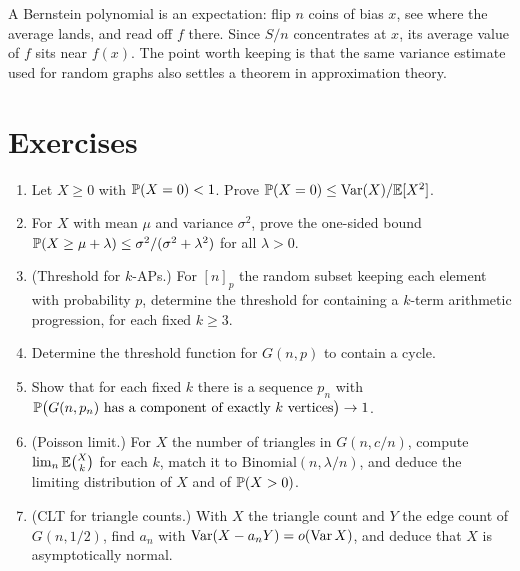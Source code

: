 \begin{insight}
A Bernstein polynomial is an expectation: flip $n$ coins of bias $x$, see where
the average lands, and read off $f$ there. Since $S/n$ concentrates at $x$, its
average value of $f$ sits near $f(x)$. The point worth keeping is that the same
variance estimate used for random graphs also settles a theorem in
approximation theory.
\end{insight}

\section*{Exercises}

\begin{enumerate}[itemsep=4pt]
  \item Let $X\ge0$ with $\mathbb{P}(X=0)<1$. Prove
        $\mathbb{P}(X=0)\le\operatorname{Var}(X)/\mathbb{E}[X^2]$.
  \item For $X$ with mean $\mu$ and variance $\sigma^2$, prove the one-sided
        bound $\mathbb{P}(X\ge\mu+\lambda)\le\sigma^2/(\sigma^2+\lambda^2)$ for all
        $\lambda>0$.
  \item (Threshold for $k$-APs.) For $[n]_p$ the random subset keeping each
        element with probability $p$, determine the threshold for containing a
        $k$-term arithmetic progression, for each fixed $k\ge3$.
  \item Determine the threshold function for $G(n,p)$ to contain a cycle.
  \item Show that for each fixed $k$ there is a sequence $p_n$ with
        $\mathbb{P}\bigl(G(n,p_n)\text{ has a component of exactly }k\text{ vertices}\bigr)\to1$.
  \item (Poisson limit.) For $X$ the number of triangles in $G(n,c/n)$, compute
        $\lim_n\mathbb{E}\binom Xk$ for each $k$, match it to
        $\mathrm{Binomial}(n,\lambda/n)$, and deduce the limiting distribution of
        $X$ and of $\mathbb{P}(X>0)$.
  \item (CLT for triangle counts.) With $X$ the triangle count and $Y$ the edge
        count of $G(n,1/2)$, find $a_n$ with $\operatorname{Var}(X-a_nY)=o(\operatorname{Var} X)$, and deduce
        that $X$ is asymptotically normal.
\end{enumerate}
